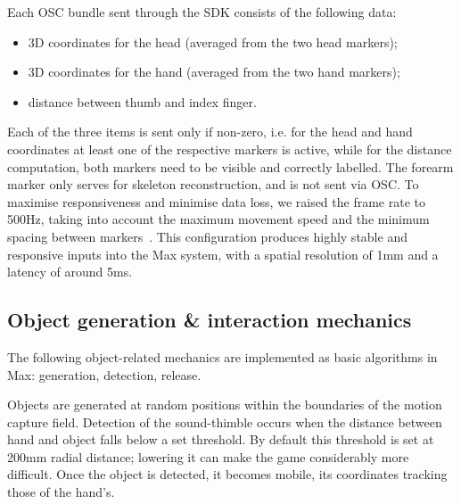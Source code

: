 Each OSC bundle sent through the SDK consists of the following data:
\begin{itemize}
	\item 3D coordinates for the head (averaged from the two head markers);
	\item 3D coordinates for the hand (averaged from the two hand markers);
	\item distance between thumb and index finger.
\end{itemize}

Each of the three items is sent only if non-zero, i.e. for the head and hand coordinates at least one of the respective markers is active, while for the distance computation, both markers need to be visible and correctly labelled. The forearm marker only serves for skeleton reconstruction, and is not sent via OSC.
To maximise responsiveness and minimise data loss, we raised the frame rate to 500Hz, taking into account the maximum movement speed and the minimum spacing between markers~\cite{song2016fast}. This configuration produces highly stable and responsive inputs into the Max system, with a spatial resolution of 1mm and a latency of around 5ms.

\subsection{Object generation \& interaction mechanics}

The following object-related mechanics are implemented as basic algorithms in Max: generation, detection, release.

Objects are generated at random positions within the boundaries of the motion capture field. Detection of the sound-thimble occurs when the distance between hand and object falls below a set threshold. By default this threshold is set at 200mm radial distance; lowering it can make the game considerably more difficult. Once the object is detected, it becomes mobile, its coordinates tracking those of the hand's.

